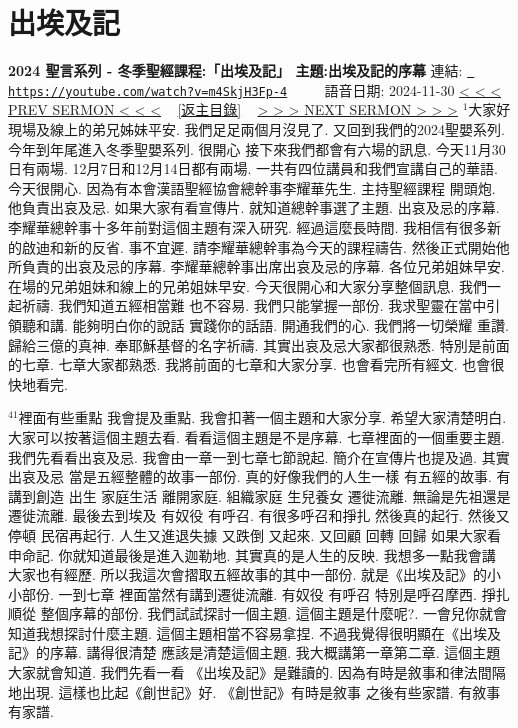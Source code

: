 \documentclass{book}
\begin{document}
\section{出埃及記}
\label{sec:m4SkjH3Fp_4}
\textbf{2024 聖言系列 - 冬季聖經課程:「出埃及記」 主題:出埃及記的序幕}
\newline
\newline
連結: \href{https://youtube.com/watch?v=m4SkjH3Fp-4}{\texttt{ https://youtube.com/watch?v=m4SkjH3Fp-4}} ~~~~ 語音日期: 2024-11-30 
\newline
\newline
\hyperref[sec:code]{\small{< < < PREV SERMON < < <}}
~
\hyperref[sec:index]{\small{[返主目錄]}}
~
\hyperref[sec:dqXyjOETQK4]{\small{> > > NEXT SERMON > > >}}
\newline
\newline
$^{1}$大家好 現場及線上的弟兄姊妹平安.
我們足足兩個月沒見了.
又回到我們的2024聖嬰系列.
今年到年尾進入冬季聖嬰系列.
很開心 接下來我們都會有六場的訊息.
今天11月30日有兩場.
12月7日和12月14日都有兩場.
一共有四位講員和我們宣講自己的華語.
今天很開心.
因為有本會漢語聖經協會總幹事李耀華先生.
主持聖經課程 開頭炮.
他負責出哀及忌.
如果大家有看宣傳片.
就知道總幹事選了主題.
出哀及忌的序幕.
李耀華總幹事十多年前對這個主題有深入研究.
經過這麼長時間.
我相信有很多新的啟迪和新的反省.
事不宜遲.
請李耀華總幹事為今天的課程禱告.
然後正式開始他所負責的出哀及忌的序幕.
李耀華總幹事出席出哀及忌的序幕.
各位兄弟姐妹早安.
在場的兄弟姐妹和線上的兄弟姐妹早安.
今天很開心和大家分享整個訊息.
我們一起祈禱.
我們知道五經相當難 也不容易.
我們只能掌握一部份.
我求聖靈在當中引領聽和講.
能夠明白你的說話 實踐你的話語.
開通我們的心.
我們將一切榮耀 重讚.
歸給三億的真神.
奉耶穌基督的名字祈禱.
其實出哀及忌大家都很熟悉.
特別是前面的七章.
七章大家都熟悉.
我將前面的七章和大家分享.
也會看完所有經文.
也會很快地看完.

$^{41}$裡面有些重點 我會提及重點.
我會扣著一個主題和大家分享.
希望大家清楚明白.
大家可以按著這個主題去看.
看看這個主題是不是序幕.
七章裡面的一個重要主題.
我們先看看出哀及忌.
我會由一章一到七章七節說起.
簡介在宣傳片也提及過.
其實出哀及忌 當是五經整體的故事一部份.
真的好像我們的人生一樣 有五經的故事.
有講到創造 出生 家庭生活 離開家庭.
組織家庭 生兒養女 遷徙流離.
無論是先祖還是遷徙流離.
最後去到埃及 有奴役 有呼召.
有很多呼召和掙扎 然後真的起行.
然後又停頓 民宿再起行.
人生又進退失據 又跌倒 又起來.
又回顧 回轉 回歸 如果大家看申命記.
你就知道最後是進入迦勒地.
其實真的是人生的反映.
我想多一點我會講 大家也有經歷.
所以我這次會摺取五經故事的其中一部份.
就是《出埃及記》的小小部份.
一到七章 裡面當然有講到遷徙流離.
有奴役 有呼召 特別是呼召摩西.
掙扎 順從 整個序幕的部份.
我們試試探討一個主題.
這個主題是什麼呢?.
一會兒你就會知道我想探討什麼主題.
這個主題相當不容易拿捏.
不過我覺得很明顯在《出埃及記》的序幕.
講得很清楚 應該是清楚這個主題.
我大概講第一章第二章.
這個主題大家就會知道.
我們先看一看 《出埃及記》是難讀的.
因為有時是敘事和律法間隔地出現.
這樣也比起《創世記》好.
《創世記》有時是敘事 之後有些家譜.
有敘事 有家譜.
\end{document}
